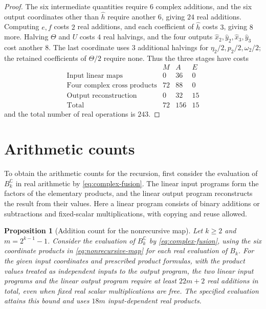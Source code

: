 \documentclass[11pt,reqno]{amsart}
\numberwithin{equation}{section}
\newtheorem{proposition}{Proposition}[section]
\newcommand{\C}{\mathbb C}
\begin{document}
\begin{proof}
The six intermediate quantities require $6$ complex additions, and the
six output coordinates other than $\widehat h$ require another $6$,
giving $24$ real additions. Computing $e,f$ costs $2$ real additions,
and each coefficient of $\widehat h$ costs $3$, giving $8$ more. Halving
$\Theta$ and $U$ costs $4$ real halvings, and the four outputs
$\widehat x_2,\widehat y_2,\widehat x_3,\widehat y_3$ cost another $8$.
The last coordinate uses $3$ additional halvings for
$\eta_2/2,p_2/2,\omega_2/2$; the retained coefficients of $\Theta/2$
require none. Thus the three stages have costs
\[
\begin{array}{lrrr}
 & M&A&E\\
\text{Input linear maps}&0&36&0\\
\text{Four complex cross products}&72&88&0\\
\text{Output reconstruction}&0&32&15\\ \hline
\text{Total}&72&156&15
\end{array}
\]
and the total number of real operations is $243$.
\end{proof}

\section{Arithmetic counts}
\label{subsec:operation-counts}

To obtain the arithmetic counts for the recursion, first consider the
evaluation of $B_k^{\C}$ in real arithmetic by
\eqref{eq:complex-fusion}. The linear input programs form the factors
of the elementary products, and the linear output program reconstructs
the result from their values. Here a linear program consists of binary
additions or subtractions and fixed-scalar multiplications, with copying
and reuse allowed.

\begin{proposition}[Addition count for the nonrecursive
map]\label{prop:nonrecursive-additions}
Let $k\ge2$ and $m=2^{k-1}-1$. Consider the evaluation of $B_k^{\C}$ by
\eqref{eq:complex-fusion}, using the six coordinate products
in \eqref{eq:nonrecursive-map} for each real evaluation of $B_k$.
For the given input coordinates and
prescribed product formulas, with the product values treated as
independent inputs to the output program, the two linear input programs
and the linear output program require at least $22m+2$ real additions
in total, even when fixed real scalar multiplications are free.
The specified evaluation attains this bound and uses $18m$
input-dependent real products.
\end{proposition}
\end{document}
